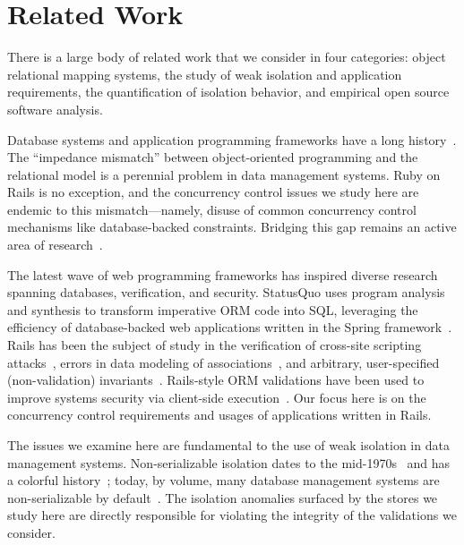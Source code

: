 
\section{Related Work}
\label{sec:relatedwork}

There is a large body of related work that we consider in four
categories: object relational mapping systems, the study of weak
isolation and application requirements, the quantification of isolation
behavior, and empirical open source software analysis.

 Database systems and application programming
frameworks have a long
history~\cite{objectstore,shore,bernstein-orm}. The ``impedance
mismatch'' between object-oriented programming and the relational
model is a perennial problem in data management systems. Ruby on Rails
is no exception, and the concurrency control issues we study here are
endemic to this mismatch---namely, disuse of common concurrency
control mechanisms like database-backed constraints. Bridging this gap
remains an active area of research~\cite{db-to-model}.

The latest wave of web programming frameworks has inspired diverse
research spanning databases, verification, and security. StatusQuo
uses program analysis and synthesis to transform imperative ORM code
into SQL, leveraging the efficiency of database-backed web
applications written in the Spring framework~\cite{statusquo}. Rails
has been the subject of study in the verification of cross-site
scripting attacks~\cite{rails-xss}, errors in data
modeling of associations~\cite{rails-bounded}, and arbitrary,
user-specified (non-validation) invariants~\cite{invariant-web}.
Rails-style ORM validations have been used to improve systems security
via client-side execution~\cite{waves,caveat}. Our focus here is on
the concurrency control requirements and usages of applications
written in Rails.

 The issues we examine here
are fundamental to the use of weak isolation in data management
systems. Non-serializable isolation dates to the
mid-1970s~\cite{gray-isolation} and has a colorful
history~\cite{adya-isolation}; today, by volume, many database
management systems are non-serializable by
default~\cite{hat-vldb}. The isolation anomalies surfaced by
the stores we study here are directly responsible for violating the
integrity of the validations we consider.


